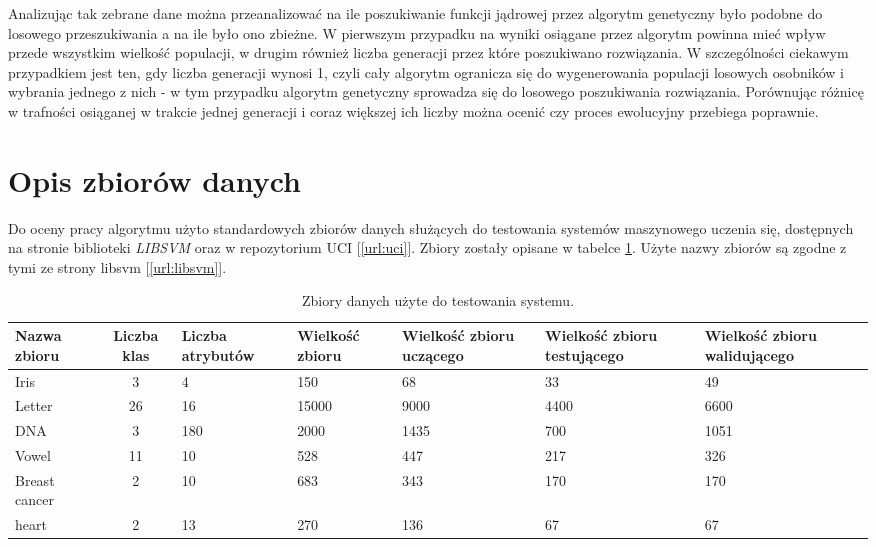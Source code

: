 	Analizując tak zebrane dane można przeanalizować na ile poszukiwanie funkcji jądrowej przez algorytm genetyczny było podobne do losowego przeszukiwania a na ile było ono zbieżne. W pierwszym przypadku na wyniki osiągane przez algorytm powinna mieć wpływ przede wszystkim wielkość populacji, w drugim również liczba generacji przez które poszukiwano rozwiązania. W szczególności ciekawym przypadkiem jest ten, gdy liczba generacji wynosi 1, czyli cały algorytm ogranicza się do wygenerowania populacji losowych osobników i wybrania jednego z nich - w tym przypadku algorytm genetyczny sprowadza się do losowego poszukiwania rozwiązania. Porównując różnicę w trafności osiąganej w trakcie jednej generacji i coraz większej ich liczby można ocenić czy proces ewolucyjny przebiega poprawnie. 
	
\section{Opis zbiorów danych}
	Do oceny pracy algorytmu użyto standardowych zbiorów danych służących do testowania systemów maszynowego uczenia się, dostępnych na stronie biblioteki \emph{LIBSVM} \cite{chang_libsvm:_2011}  oraz w repozytorium UCI  [\ref{url:uci}]. Zbiory zostały opisane w tabelce \ref{tab:datasets}. Użyte nazwy zbiorów są zgodne z tymi ze strony libsvm [\ref{url:libsvm}].

\begin{table}[ht]
	\caption{Zbiory danych użyte do testowania systemu.\label{tab:datasets}} 	
	\begin{tabular}{|p{2cm}|c|p{1.5cm}|p{1.5cm}|p{1.5cm}|p{1.5cm}|p{1.5cm}|}
		\hline 
		Nazwa zbioru & Liczba klas & \hspace{0pt} Liczba atrybutów & \hspace{0pt} Wielkość zbioru & \hspace{0pt} Wielkość zbioru uczącego & \hspace{0pt}Wielkość zbioru testującego & \hspace{0pt} Wielkość zbioru walidującego \\
		\hline 
		Iris & 3 & 4 & 150 & 68 & 33 & 49  \\ 
		\hline 
		Letter & 26 & 16 & 15000 & 9000 & 4400 & 6600\\ 
		\hline 
		DNA & 3 & 180 & 2000 & 1435 & 700 & 1051 \\ 
		\hline 
		Vowel & 11 & 10 & 528 & 447 & 217 & 326 \\ 
		\hline
		Breast cancer & 2 & 10 & 683 & 343 & 170 & 170 \\ 
		\hline
		heart & 2 & 13 & 270 & 136 & 67 & 67 \\ 
		\hline
	\end{tabular} 	
\end{table}

